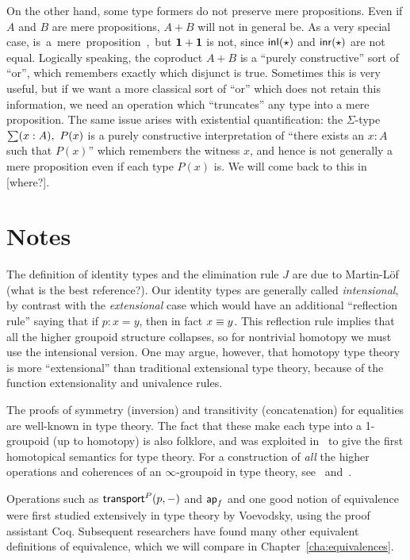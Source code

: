 On the other hand, some type formers do not preserve mere propositions.
Even if $A$ and $B$ are mere propositions, $A+B$ will not in general be.
As a very special case, \unit is a mere proposition, but $\mathbf{1}+\mathbf{1}$ is not, since $\mathsf{inl}(\star)$ and $\mathsf{inr}(\star)$ are not equal.
Logically speaking, the coproduct $A+B$ is a ``purely constructive'' sort of ``or'', which remembers exactly which disjunct is true.
Sometimes this is very useful, but if we want a more classical sort of ``or'' which does not retain this information, we need an operation which ``truncates'' any type into a mere proposition.
The same issue arises with existential quantification: the $\Sigma$-type $\sm{x:A} P(x)$ is a purely constructive interpretation of ``there exists an $x:A$ such that $P(x)$'' which remembers the witness $x$, and hence is not generally a mere proposition even if each type $P(x)$ is.
We will come back to this in [where?].


\section*{Notes}
\label{sec:notes}

The definition of identity types and the elimination rule $J$ are due to Martin-L\"of (what is the best reference?).
Our identity types are generally called \emph{intensional}, by contrast with the \emph{extensional} case which would have an additional ``reflection rule'' saying that if $p:x=y$, then in fact $x\equiv y$.
This reflection rule implies that all the higher groupoid structure collapses, so for nontrivial homotopy we must use the intensional version.
One may argue, however, that homotopy type theory is more ``extensional'' than traditional extensional type theory, because of the function extensionality and univalence rules.

The proofs of symmetry (inversion) and transitivity (concatenation) for equalities are well-known in type theory.
The fact that these make each type into a 1-groupoid (up to homotopy) is also folklore, and was exploited in~\cite{hs:gpd-typethy} to give the first homotopical semantics for type theory.
For a construction of \emph{all} the higher operations and coherences of an $\infty$-groupoid in type theory, see~\cite{pll:wkom-type} and~\cite{bg:type-wkom}.

Operations such as $\mathsf{transport}^{P}(p,-)$ and $\mathsf{ap}_{f}$ and one good notion of equivalence were first studied extensively in type theory by Voevodsky, using the proof assistant Coq.
Subsequent researchers have found many other equivalent definitions of equivalence, which we will compare in Chapter~\ref{cha:equivalences}.

